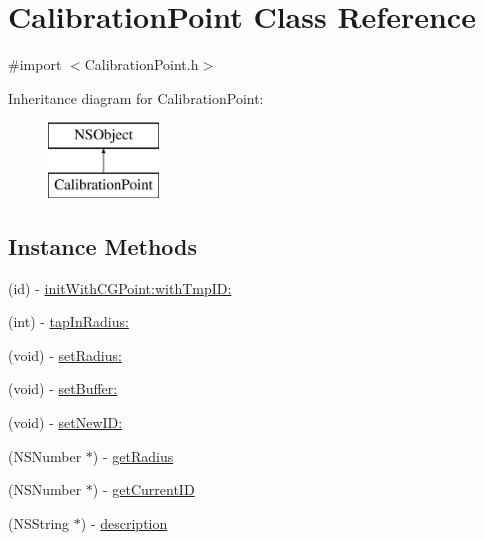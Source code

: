\hypertarget{interface_calibration_point}{\section{Calibration\-Point Class Reference}
\label{interface_calibration_point}
}


{\ttfamily \#import $<$Calibration\-Point.\-h$>$}

Inheritance diagram for Calibration\-Point\-:\begin{figure}[H]
\begin{center}
\leavevmode
\includegraphics[height=2.000000cm]{interface_calibration_point}
\end{center}
\end{figure}
\subsection*{Instance Methods}
\begin{DoxyCompactItemize}
\item 
(id) -\/ \hyperlink{interface_calibration_point_ab6ebbd73f31a6ed29f4b4ffe81a2a7cc}{init\-With\-C\-G\-Point\-:with\-Tmp\-I\-D\-:}
\item 
(int) -\/ \hyperlink{interface_calibration_point_addd03495bca0aa57e4390139951cb06e}{tap\-In\-Radius\-:}
\item 
(void) -\/ \hyperlink{interface_calibration_point_acd24121058ebbd8d440827e2fe202838}{set\-Radius\-:}
\item 
(void) -\/ \hyperlink{interface_calibration_point_a71cced6b4311d5ee9131d5a065a8fb47}{set\-Buffer\-:}
\item 
(void) -\/ \hyperlink{interface_calibration_point_a8ad01981fdd2cda7b3080e7055f3d953}{set\-New\-I\-D\-:}
\item 
(N\-S\-Number $\ast$) -\/ \hyperlink{interface_calibration_point_a69b8d056e442cf03a92f0f4439ee5e33}{get\-Radius}
\item 
(N\-S\-Number $\ast$) -\/ \hyperlink{interface_calibration_point_a3559081e927aaa055b8f3dadac64d3cb}{get\-Current\-I\-D}
\item 
(N\-S\-String $\ast$) -\/ \hyperlink{interface_calibration_point_a820af53483703a37cea1284561476b26}{description}
\end{DoxyCompactItemize}
